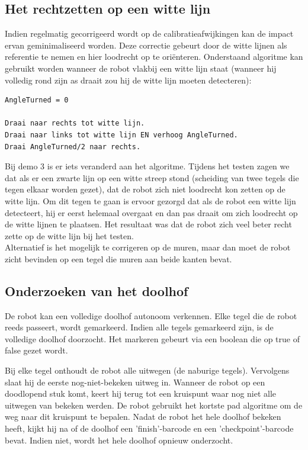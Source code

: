 \documentclass[tt3]{penoverslag}
\begin{document}
\subsection{Het rechtzetten op een witte lijn} %
\label{ssec:algoWitteL}
Indien regelmatig gecorrigeerd wordt op de calibratieafwijkingen kan de impact ervan geminimaliseerd worden. Deze correctie gebeurt door de witte lijnen als referentie te nemen en hier loodrecht op te ori\"enteren.
Onderstaand algoritme kan gebruikt worden wanneer de robot vlakbij een witte lijn staat (wanneer hij volledig rond zijn as draait zou hij de witte lijn moeten detecteren):

\lstset{frame=single, caption=Witte Lijn algoritme (pseudocode),
		label=code:algoWitteL, numbers=left, numberstyle=\footnotesize,
		basicstyle=\sffamily, numbersep=5pt}
\begin{lstlisting}
AngleTurned = 0

Draai naar rechts tot witte lijn.
Draai naar links tot witte lijn EN verhoog AngleTurned.
Draai AngleTurned/2 naar rechts.
\end{lstlisting}

Bij demo 3 is er iets veranderd aan het algoritme. Tijdens het testen zagen we dat als er een zwarte lijn op een witte streep stond (scheiding van twee tegels die tegen elkaar worden gezet), dat de robot zich niet loodrecht kon zetten op de witte lijn. Om dit tegen te gaan is ervoor gezorgd dat als de robot een witte lijn detecteert, hij er eerst helemaal overgaat en dan pas draait om zich loodrecht op de witte lijnen te plaatsen. Het resultaat was dat de robot zich veel beter recht zette op de witte lijn bij het testen.\\

Alternatief is het mogelijk te corrigeren op de muren, maar dan moet de robot zicht bevinden op een tegel die muren aan beide kanten bevat.


\subsection{Onderzoeken van het doolhof} %
\label{ssec:algoOnderzDoolhof}
De robot kan een volledige doolhof autonoom verkennen. Elke tegel die de robot reeds passeert, wordt gemarkeerd. Indien alle tegels gemarkeerd zijn, is de volledige doolhof doorzocht. Het markeren gebeurt via een boolean die op true of false gezet wordt.

Bij elke tegel onthoudt de robot alle uitwegen (de naburige tegels). Vervolgens slaat hij de eerste nog-niet-bekeken uitweg in. Wanneer de robot op een doodlopend stuk komt, keert hij terug tot een kruispunt waar nog niet alle uitwegen van bekeken werden. De robot gebruikt het kortste pad algoritme om de weg naar dit kruispunt te bepalen.
Nadat de robot het hele doolhof bekeken heeft, kijkt hij na of de doolhof een 'finish'-barcode en een 'checkpoint'-barcode bevat. Indien niet, wordt het hele doolhof opnieuw onderzocht.\\
\end{document}
